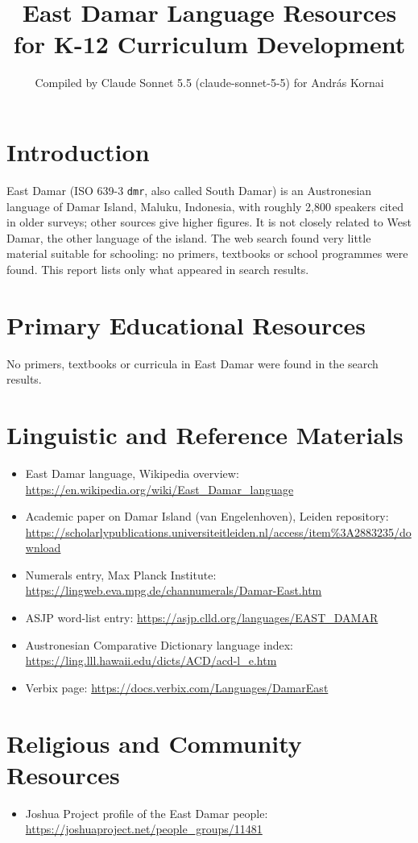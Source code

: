 \documentclass[12pt]{article}
\title{East Damar Language Resources for K-12 Curriculum Development}
\author{Compiled by Claude Sonnet 5.5 (claude-sonnet-5-5) for Andr\'as Kornai}
\date{}
\begin{document}
\maketitle

\section{Introduction}
East Damar (ISO 639-3 \texttt{dmr}, also called South Damar) is an Austronesian language of Damar Island, Maluku, Indonesia, with roughly 2,800 speakers cited in older surveys; other sources give higher figures. It is not closely related to West Damar, the other language of the island. The web search found very little material suitable for schooling: no primers, textbooks or school programmes were found. This report lists only what appeared in search results.

\section{Primary Educational Resources}
No primers, textbooks or curricula in East Damar were found in the search results.

\section{Linguistic and Reference Materials}
\begin{itemize}
\item East Damar language, Wikipedia overview: \url{https://en.wikipedia.org/wiki/East_Damar_language}
\item Academic paper on Damar Island (van Engelenhoven), Leiden repository: \url{https://scholarlypublications.universiteitleiden.nl/access/item%3A2883235/download}
\item Numerals entry, Max Planck Institute: \url{https://lingweb.eva.mpg.de/channumerals/Damar-East.htm}
\item ASJP word-list entry: \url{https://asjp.clld.org/languages/EAST_DAMAR}
\item Austronesian Comparative Dictionary language index: \url{https://ling.lll.hawaii.edu/dicts/ACD/acd-l_e.htm}
\item Verbix page: \url{https://docs.verbix.com/Languages/DamarEast}
\end{itemize}

\section{Religious and Community Resources}
\begin{itemize}
\item Joshua Project profile of the East Damar people: \url{https://joshuaproject.net/people_groups/11481}
\end{itemize}
\end{document}
